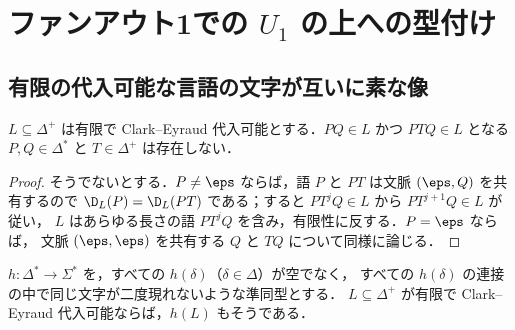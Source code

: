 \section{ファンアウト1での \texorpdfstring{$U_1$}{U1} の上への型付け}
\label{app:u1-typings}

\subsection{有限の代入可能な言語の文字が互いに素な像}

\begin{lemma}\label{lem:app-u1-insertion}
$L\subseteq\Delta^+$ は有限で Clark--Eyraud 代入可能とする．$PQ\in L$ かつ $PTQ\in L$ となる
$P,Q\in\Delta^*$ と $T\in\Delta^+$ は存在しない．
\end{lemma}

\begin{proof}
そうでないとする．$P\ne\eps$ ならば，語 $P$ と $PT$ は文脈 $(\eps,Q)$ を共有するので
$\D_L(P)=\D_L(PT)$ である；すると $PT^jQ\in L$ から $PT^{j+1}Q\in L$ が従い，
$L$ はあらゆる長さの語 $PT^jQ$ を含み，有限性に反する．$P=\eps$ ならば，
文脈 $(\eps,\eps)$ を共有する $Q$ と $TQ$ について同様に論じる．
\end{proof}

\begin{lemma}\label{lem:app-u1-code}
$h:\Delta^*\to\Sigma^*$ を，すべての $h(\delta)$（$\delta\in\Delta$）が空でなく，
すべての $h(\delta)$ の連接の中で同じ文字が二度現れないような準同型とする．
$L\subseteq\Delta^+$ が有限で Clark--Eyraud 代入可能ならば，$h(L)$ もそうである．
\end{lemma}

